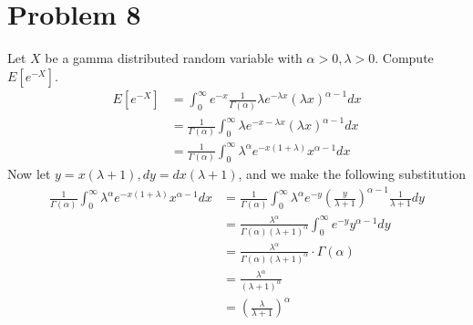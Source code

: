 \documentclass{article}
\begin{document}
\section*{Problem 8}
    Let $X$ be a gamma distributed random variable with $\alpha > 0, \lambda > 0$.
    Compute $E[e^{-X}]$.
    \begin{align*}
        E[e^{-X}] &= \int_0^\infty e^{-x} \frac{1}{\Gamma(\alpha)}\lambda e^{-\lambda x}(\lambda x)^{\alpha - 1}dx\\
        &=\frac{1}{\Gamma(\alpha)} \int_0^\infty \lambda e^{-x - \lambda x} ( \lambda x)^{\alpha - 1} dx\\
        &=\frac{1}{\Gamma(\alpha)} \int_0^\infty \lambda^\alpha e^{-x(1 + \lambda)}x^{\alpha - 1} dx
    \end{align*}
    Now let $y = x(\lambda + 1), dy = dx(\lambda + 1)$, and we make the following substitution
    \begin{align*}
        \frac{1}{\Gamma(\alpha)} \int_0^\infty \lambda^\alpha e^{-x(1 + \lambda)}x^{\alpha - 1} dx &= 
        \frac{1}{\Gamma(\alpha)} \int_0^\infty \lambda^\alpha e^{-y}(\frac{y}{\lambda+1})^{\alpha - 1} \frac{1}{\lambda+1} dy\\
        &= \frac{\lambda^\alpha}{\Gamma(\alpha)(\lambda+1)^\alpha} \int_0^\infty e^{-y}y^{\alpha - 1}dy\\
        &= \frac{\lambda^\alpha}{\Gamma(\alpha)(\lambda+1)^\alpha} \cdot \Gamma(\alpha)\\
        &= \frac{\lambda^\alpha}{(\lambda+1)^\alpha}\\
        & = \left(\frac{\lambda}{\lambda+1}\right)^\alpha
    \end{align*}
\end{document}
